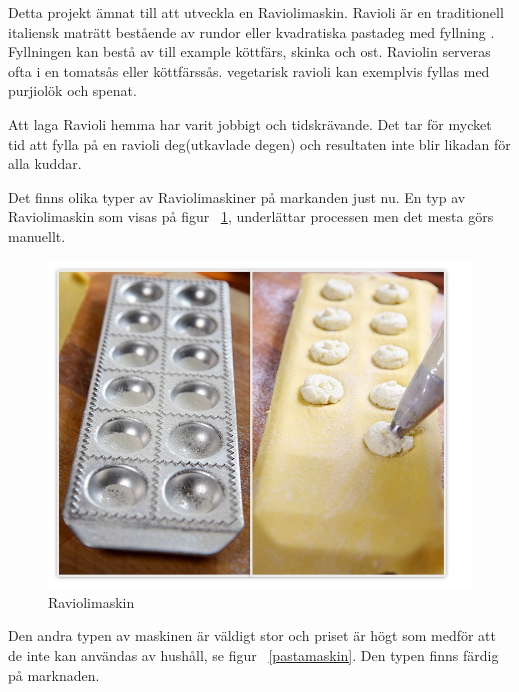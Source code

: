 Detta projekt ämnat till att utveckla en Raviolimaskin. Ravioli är en traditionell italiensk maträtt bestående av rundor eller kvadratiska pastadeg med fyllning \cite{engproc}. Fyllningen kan bestå av till example köttfärs, skinka och ost. Raviolin serveras ofta i en tomatsås eller köttfärssås. vegetarisk ravioli kan exemplvis fyllas med purjiolök och spenat.\medskip

Att laga Ravioli hemma har varit jobbigt och tidskrävande. Det tar för mycket tid att fylla på en ravioli deg(utkavlade degen) och resultaten inte blir likadan för alla kuddar.\medskip

Det finns olika typer av Raviolimaskiner på markanden just nu. En typ av Raviolimaskin som visas på figur ~\ref{ravioli}, underlättar processen men det mesta görs manuellt.\medskip

	\begin{figure}[h]
		\begin{center}
			\includegraphics[scale=0.5]{images/raviolimoldwithfilling.jpg}
			\caption{Raviolimaskin}
			\label{ravioli}	
		\end{center}
	\end{figure}
Den andra typen av maskinen är väldigt stor och priset är högt som medför att de inte kan användas av hushåll, se figur ~\ref{pastamaskin}. Den typen finns färdig på marknaden.
